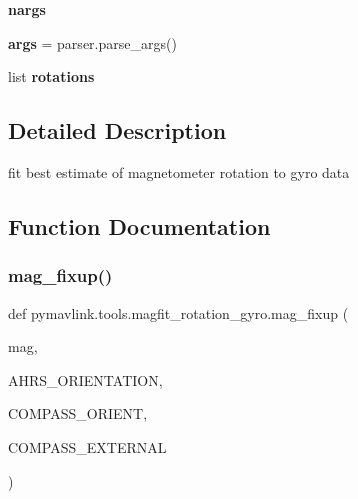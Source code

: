 \begin{DoxyCompactItemize}
{\bfseries nargs}
\item 
\mbox{\label{namespacepymavlink_1_1tools_1_1magfit__rotation__gyro_a27834f9ffa92cdae1fa567e5898adb84}} 
{\bfseries args} = parser.\+parse\+\_\+args()
\item 
\mbox{\label{namespacepymavlink_1_1tools_1_1magfit__rotation__gyro_a5c1736b19d46521b3acc4397d60cd1d7}} 
list {\bfseries rotations}
\end{DoxyCompactItemize}


\subsection{Detailed Description}
\begin{DoxyVerb}fit best estimate of magnetometer rotation to gyro data
\end{DoxyVerb}
 

\subsection{Function Documentation}
\mbox{\label{namespacepymavlink_1_1tools_1_1magfit__rotation__gyro_af1e9e314abb16f339b04627f6de1d866}} 
\subsubsection{\texorpdfstring{mag\+\_\+fixup()}{mag\_fixup()}}
{\footnotesize\ttfamily def pymavlink.\+tools.\+magfit\+\_\+rotation\+\_\+gyro.\+mag\+\_\+fixup (\begin{DoxyParamCaption}\item[{}]{mag,  }\item[{}]{A\+H\+R\+S\+\_\+\+O\+R\+I\+E\+N\+T\+A\+T\+I\+ON,  }\item[{}]{C\+O\+M\+P\+A\+S\+S\+\_\+\+O\+R\+I\+E\+NT,  }\item[{}]{C\+O\+M\+P\+A\+S\+S\+\_\+\+E\+X\+T\+E\+R\+N\+AL }\end{DoxyParamCaption})}

